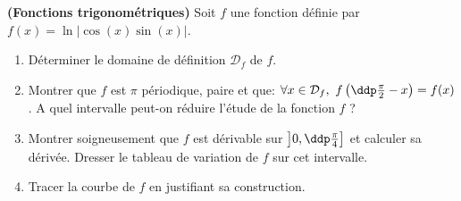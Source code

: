 
\begin{exercice}  \;
\textbf{(Fonctions trigonom\'etriques)}
\noindent Soit $f$ une fonction d\'efinie par $f(x)=\ln{\left|  \cos{(x)}\sin{(x)} \right|}$.
\begin{enumerate}
\item D\'eterminer le domaine de d\'efinition $\mathcal{D}_f$ de $f$.
\item Montrer que $f$ est $\pi$ p\'eriodique, paire et que: $\forall x\in\mathcal{D}_f,\ f\left( \ddp\frac{\pi}{2}-x\right)=f(x)$. A quel intervalle peut-on r\'eduire l'\'etude de la fonction $f$ ?
\item Montrer soigneusement que $f$ est d\'erivable sur $\left \rbrack 0,\ddp\frac{\pi}{4}\right\rbrack$ et calculer sa d\'eriv\'ee. Dresser le tableau de variation de $f$ sur cet intervalle.
\item Tracer la courbe de $f$ en justifiant sa construction.
\end{enumerate}
\end{exercice}